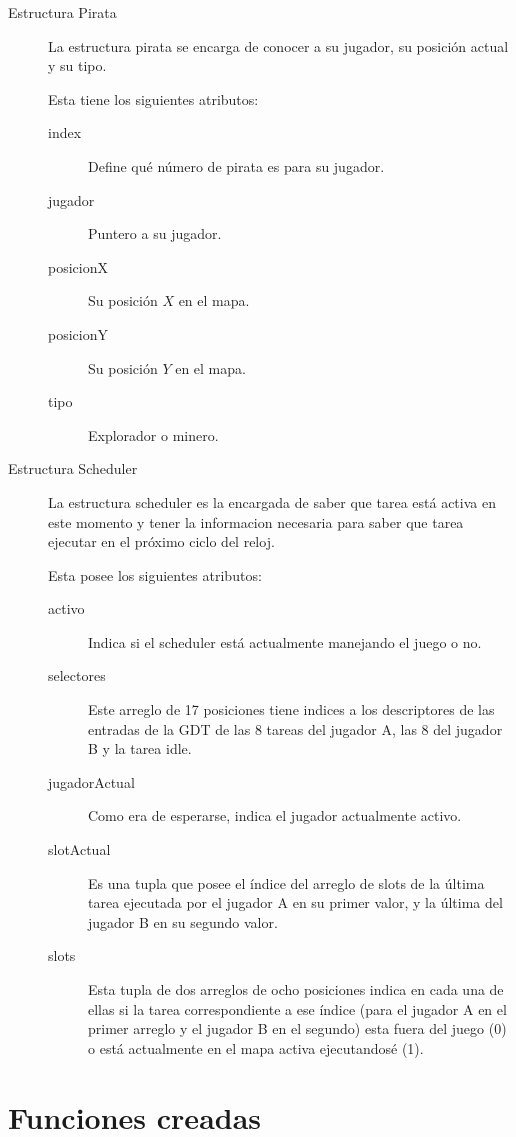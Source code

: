 \begin{description}
\item[Estructura Pirata]
  La estructura pirata se encarga de conocer a su jugador, su posición actual y
  su tipo.

  Esta tiene los siguientes atributos:

  \begin{description}
    \item[index] Define qué número de pirata es para su jugador.
    \item[jugador] Puntero a su jugador.
    \item[posicionX] Su posición $X$ en el mapa.
    \item[posicionY] Su posición $Y$ en el mapa.
    \item[tipo] Explorador o minero.
  \end{description}

\item[Estructura Scheduler]
  La estructura scheduler es la encargada de saber que tarea está activa en
  este momento y tener la informacion necesaria para saber que tarea ejecutar en
  el próximo ciclo del reloj.

  Esta posee los siguientes atributos:
\begin{description}
    \item[activo] Indica si el scheduler está actualmente manejando el juego o
    no.
    \item[selectores] Este arreglo de 17 posiciones tiene indices a los
    descriptores de las entradas de la GDT de las 8 tareas del jugador A, las 8
    del jugador B y la tarea idle.
    \item[jugadorActual] Como era de esperarse, indica el jugador actualmente
    activo.
    \item[slotActual] Es una tupla que posee el índice del arreglo de slots de
    la última tarea ejecutada por el jugador A en su primer valor, y la última
    del jugador B en su segundo valor.
    \item[slots] Esta tupla de dos arreglos de ocho posiciones indica en cada
    una de ellas si la tarea correspondiente a ese índice (para el jugador A en
    el primer arreglo y el jugador B en el segundo) esta fuera del juego (0) o
    está actualmente en el mapa activa ejecutandosé (1).
\end{description}

\end{description}


\section{Funciones creadas}

